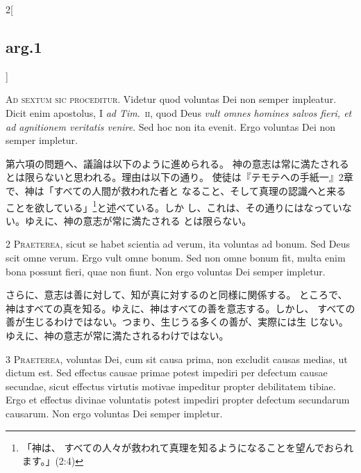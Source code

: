 \documentclass[paper=a4paper,fontsize=10pt,jafontsize=9pt,titlepage]{jlreq}
\begin{document}
\begin{paracol}{2}[\subsection{arg.1}]


{\huge A}{\scshape d sextum sic proceditur}. Videtur quod
voluntas Dei non semper impleatur. Dicit enim apostolus, I {\itshape ad
 Tim}.~{\scshape ii}, quod Deus {\itshape vult omnes homines salvos fieri, et ad agnitionem veritatis
venire}. Sed hoc non ita evenit. Ergo voluntas Dei non semper impletur.

\switchcolumn

第六項の問題へ、議論は以下のように進められる。
神の意志は常に満たされるとは限らないと思われる。理由は以下の通り。
使徒は『テモテへの手紙一』2章で、神は「すべての人間が救われた者と
 なること、そして真理の認識へと来ることを欲している」\footnote{「神は、
 すべての人々が救われて真理を知るようになることを望んでおられます。」(2:4)}と述べている。しか
 し、これは、その通りにはなっていない。ゆえに、神の意志が常に満たされる
 とは限らない。



{\scshape 2 Praeterea}, sicut se habet scientia ad
verum, ita voluntas ad bonum. Sed Deus scit omne verum. Ergo vult omne
bonum. Sed non omne bonum fit, multa enim bona possunt fieri, quae non
fiunt. Non ergo voluntas Dei semper impletur.

\switchcolumn

さらに、意志は善に対して、知が真に対するのと同様に関係する。
ところで、神はすべての真を知る。ゆえに、神はすべての善を意志する。しかし、
 すべての善が生じるわけではない。つまり、生じうる多くの善が、実際には生
 じない。ゆえに、神の意志が常に満たされるわけではない。



{\scshape 3 Praeterea}, voluntas Dei, cum sit causa
prima, non excludit causas medias, ut dictum est. Sed effectus causae
primae potest impediri per defectum causae secundae, sicut effectus
virtutis motivae impeditur propter debilitatem tibiae. Ergo et effectus
divinae voluntatis potest impediri propter defectum secundarum
causarum. Non ergo voluntas Dei semper impletur.


\end{paracol}
\end{document}

